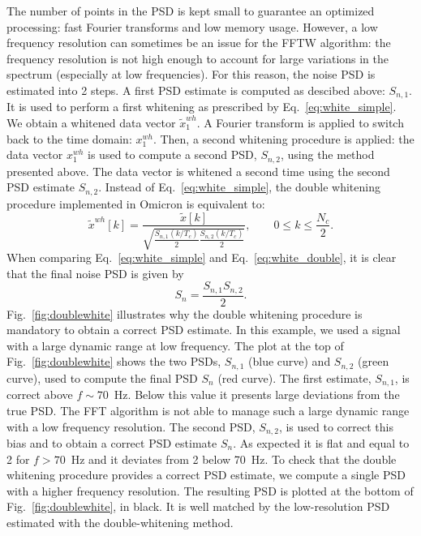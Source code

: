 The number of points in the PSD is kept small to guarantee an optimized processing: fast Fourier transforms and low memory usage. However, a low frequency resolution can sometimes be an issue for the FFTW algorithm: the frequency resolution is not high enough to account for large variations in the spectrum (especially at low frequencies). For this reason, the noise PSD is estimated into 2 steps. A first PSD estimate is computed as descibed above: $S_{n,1}$. It is used to perform a first whitening as prescribed by Eq.~\ref{eq:white_simple}. We obtain a whitened data vector $\tilde{x}_1^{wh}$. A Fourier transform is applied to switch back to the time domain: $x_1^{wh}$. Then, a second whitening procedure is applied: the data vector $x_1^{wh}$ is used to compute a second PSD, $S_{n,2}$, using the method presented above. The data vector is whitened a second time using the second PSD estimate $S_{n,2}$. Instead of Eq.~\ref{eq:white_simple}, the double whitening procedure implemented in Omicron is equivalent to:
\begin{equation}
  \tilde{x}^{wh}[k] = \frac{\tilde{x}[k]}{\sqrt{\frac{S_{n,1}(k/T_c)}{2}\frac{S_{n,2}(k/T_c)}{2}}}, \qquad 0 \le k \le \frac{N_c}{2}.
  \label{eq:white_double}
\end{equation}
When comparing Eq.~\ref{eq:white_simple} and Eq.~\ref{eq:white_double}, it is clear that the final noise PSD is given by
\begin{equation}
  S_n = \frac{S_{n,1}S_{n,2}}{2}.
\end{equation}
Fig.~\ref{fig:doublewhite} illustrates why the double whitening procedure is mandatory to obtain a correct PSD estimate. In this example, we used a signal with a large dynamic range at low frequency. The plot at the top of Fig.~\ref{fig:doublewhite} shows the two PSDs, $S_{n,1}$ (blue curve) and $S_{n,2}$ (green curve), used to compute the final PSD $S_n$ (red curve). The first estimate, $S_{n,1}$, is correct above $f\sim 70$~Hz. Below this value it presents large deviations from the true PSD. The FFT algorithm is not able to manage such a large dynamic range with a low frequency resolution. The second PSD, $S_{n,2}$, is used to correct this bias and to obtain a correct PSD estimate $S_n$. As expected it is flat and equal to 2 for $f>70$~Hz and it deviates from 2 below 70~Hz. To check that the double whitening procedure provides a correct PSD estimate, we compute a single PSD with a higher frequency resolution. The resulting PSD is plotted at the bottom of Fig.~\ref{fig:doublewhite}, in black. It is well matched by the low-resolution PSD estimated with the double-whitening method.
